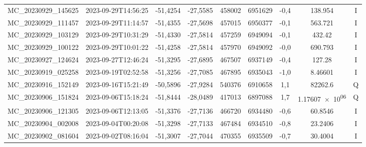 \begin{center}
\begin{longtable}{ccccS[table-format=6.0]S[table-format=7.0]ccc}
\endlastfoot
MC\_20230929\_145625 & 2023-09-29T14:56:25 & -51,4254 & -27,5585 & 458002 & 6951629 & -0,4 & \num[round-precision=3,round-mode=figures,scientific-notation=true]{138.954} & I \\
MC\_20230929\_111457 & 2023-09-29T11:14:57 & -51,4355 & -27,5698 & 457015 & 6950377 & -0,1 & \num[round-precision=3,round-mode=figures,scientific-notation=true]{563.721} & I \\
MC\_20230929\_103129 & 2023-09-29T10:31:29 & -51,4330 & -27,5814 & 457259 & 6949094 & -0,1 & \num[round-precision=3,round-mode=figures,scientific-notation=true]{432.42} & I \\
MC\_20230929\_100122 & 2023-09-29T10:01:22 & -51,4258 & -27,5814 & 457970 & 6949092 & -0,0 & \num[round-precision=3,round-mode=figures,scientific-notation=true]{690.793} & I \\
MC\_20230927\_124624 & 2023-09-27T12:46:24 & -51,3295 & -27,6895 & 467507 & 6937149 & -0,4 & \num[round-precision=3,round-mode=figures,scientific-notation=true]{127.28} & I \\
MC\_20230919\_025258 & 2023-09-19T02:52:58 & -51,3256 & -27,7085 & 467895 & 6935043 & -1,0 & \num[round-precision=3,round-mode=figures,scientific-notation=true]{8.46601} & I \\
MC\_20230916\_152149 & 2023-09-16T15:21:49 & -50,5896 & -27,9284 & 540376 & 6910658 & 1,1 & \num[round-precision=3,round-mode=figures,scientific-notation=true]{82262.6} & Q \\
MC\_20230906\_151824 & 2023-09-06T15:18:24 & -51,8444 & -28,0489 & 417013 & 6897088 & 1,7 & \num[round-precision=3,round-mode=figures,scientific-notation=true]{1.17607e+06} & Q \\
MC\_20230906\_121305 & 2023-09-06T12:13:05 & -51,3376 & -27,7136 & 466720 & 6934480 & -0,6 & \num[round-precision=3,round-mode=figures,scientific-notation=true]{60.8546} & I \\
MC\_20230904\_002008 & 2023-09-04T00:20:08 & -51,3298 & -27,7133 & 467484 & 6934510 & -0,8 & \num[round-precision=3,round-mode=figures,scientific-notation=true]{23.2406} & I \\
MC\_20230902\_081604 & 2023-09-02T08:16:04 & -51,3007 & -27,7044 & 470355 & 6935509 & -0,7 & \num[round-precision=3,round-mode=figures,scientific-notation=true]{30.4004} & I \\
\end{longtable}
\end{center}
